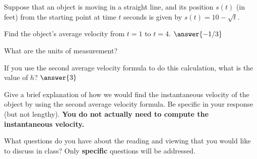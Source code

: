\documentclass{ximera}
\begin{document}
\begin{problem}
  Suppose that an object is moving in a straight line, and its
  position $s(t)$ (in feet) from the starting point at time $t$
  seconds is given by $s(t)=10-\sqrt{t}$.
  \begin{exercise}
    Find the object's average velocity from $t=1$ to
    $t=4$. $\answer{-1/3}$
  \end{exercise}
  \begin{exercise}
    What are the units of measurement?
    \begin{multipleChoice}
    \end{multipleChoice}
  \end{exercise}

  \begin{exercise}
    If you use the second average velocity formula to do this
    calculation, what is the value of $h$? $\answer{3}$
  \end{exercise}

  \begin{exercise}
    Give a brief explanation of how we would find the instantaneous
    velocity of the object by using the second average velocity
    formula. Be specific in your response (but not
    lengthy). \textbf{You do not actually need to compute the
      instantaneous velocity.}
    \begin{freeResponse}
      
    \end{freeResponse}
  \end{exercise}
\end{problem}

\begin{question}
  What questions do you have about the reading and viewing that you
  would like to discuss in class? Only \textbf{specific} questions
  will be addressed.
  \begin{freeResponse}
    
  \end{freeResponse}
\end{question}
\end{document}
